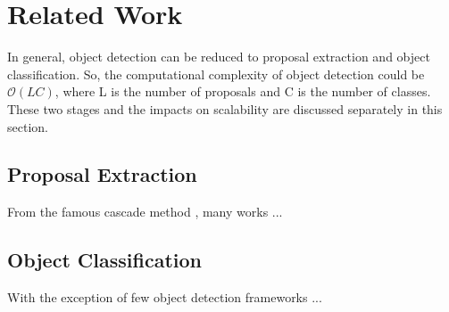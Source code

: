\chapter{Related Work}
\label{c:relate}

In general, object detection can be reduced to proposal extraction and object classification. So, the computational complexity of object detection could be $\mathcal{O}(LC)$, where L is the number of proposals and C is the number of classes. These two stages and the impacts on scalability are discussed separately in this section.

\section{Proposal Extraction}

From the famous cascade method \cite{viola2001rapid}, many works ...

\section{Object Classification}

With the exception of few object detection frameworks \cite{chen2013efficient, murphy2006object} ...